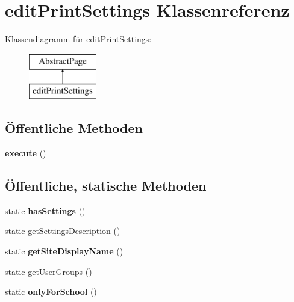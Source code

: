 \hypertarget{classedit_print_settings}{}\section{edit\+Print\+Settings Klassenreferenz}
\label{classedit_print_settings}
Klassendiagramm für edit\+Print\+Settings\+:\begin{figure}[H]
\begin{center}
\leavevmode
\includegraphics[height=2.000000cm]{classedit_print_settings}
\end{center}
\end{figure}
\subsection*{Öffentliche Methoden}
\begin{DoxyCompactItemize}
\item 
\mbox{\label{classedit_print_settings_ad87c4b7b8c15a440d40f84dec894c4da}} 
{\bfseries execute} ()
\end{DoxyCompactItemize}
\subsection*{Öffentliche, statische Methoden}
\begin{DoxyCompactItemize}
\item 
\mbox{\label{classedit_print_settings_a18eaa6790ca6b721594c31e866000f38}} 
static {\bfseries has\+Settings} ()
\item 
static \mbox{\hyperlink{classedit_print_settings_a4534915748f7bd6f5e7bea003d6d2214}{get\+Settings\+Description}} ()
\item 
\mbox{\label{classedit_print_settings_a0e370eb1c2d215a52d6b722011ff13ad}} 
static {\bfseries get\+Site\+Display\+Name} ()
\item 
static \mbox{\hyperlink{classedit_print_settings_a53a036297420dfe5e6d45e4c0f80ba0a}{get\+User\+Groups}} ()
\item 
\mbox{\label{classedit_print_settings_a511a6421be2225c03f8d8d7986ae0f9f}} 
static {\bfseries only\+For\+School} ()
\end{DoxyCompactItemize}
